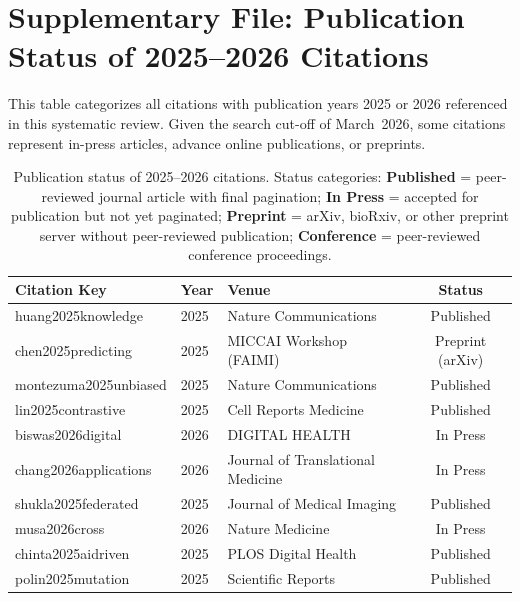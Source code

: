 
\section*{Supplementary File: Publication Status of 2025--2026 Citations}
\label{app:citations}

This table categorizes all citations with publication years 2025 or 2026 referenced in this systematic review. Given the search cut-off of March~2026, some citations represent in-press articles, advance online publications, or preprints.

\begin{table}[htbp]
  \centering
  \caption{Publication status of 2025--2026 citations. Status categories:
           \textbf{Published} = peer-reviewed journal article with final pagination;
           \textbf{In Press} = accepted for publication but not yet paginated;
           \textbf{Preprint} = arXiv, bioRxiv, or other preprint server without
           peer-reviewed publication; \textbf{Conference} = peer-reviewed
           conference proceedings.}
  \label{tab:citation_status}
  \small
  \begin{tabularx}{\linewidth}{@{}l l X c@{}}
    \toprule
    \textbf{Citation Key} & \textbf{Year} & \textbf{Venue} & \textbf{Status} \\
    \midrule
    huang2025knowledge & 2025 & Nature Communications & Published \\
    chen2025predicting & 2025 & MICCAI Workshop (FAIMI) & Preprint (arXiv) \\
    montezuma2025unbiased & 2025 & Nature Communications & Published \\
    lin2025contrastive & 2025 & Cell Reports Medicine & Published \\
    biswas2026digital & 2026 & DIGITAL HEALTH & In Press \\
    chang2026applications & 2026 & Journal of Translational Medicine & In Press \\
    shukla2025federated & 2025 & Journal of Medical Imaging & Published \\
    musa2026cross & 2026 & Nature Medicine & In Press \\
    chinta2025aidriven & 2025 & PLOS Digital Health & Published \\
    polin2025mutation & 2025 & Scientific Reports & Published \\

\end{tabularx}
\end{table}
